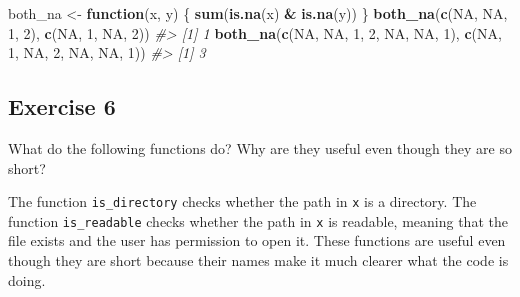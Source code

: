 \documentclass[]{book}
\newenvironment{Shaded}{\begin{snugshade}}{\end{snugshade}}
\newcommand{\CommentTok}[1]{\textcolor[rgb]{0.56,0.35,0.01}{\textit{#1}}}
\newcommand{\ControlFlowTok}[1]{\textcolor[rgb]{0.13,0.29,0.53}{\textbf{#1}}}
\newcommand{\DecValTok}[1]{\textcolor[rgb]{0.00,0.00,0.81}{#1}}
\newcommand{\KeywordTok}[1]{\textcolor[rgb]{0.13,0.29,0.53}{\textbf{#1}}}
\newcommand{\NormalTok}[1]{#1}
\newcommand{\OperatorTok}[1]{\textcolor[rgb]{0.81,0.36,0.00}{\textbf{#1}}}
\newcommand{\OtherTok}[1]{\textcolor[rgb]{0.56,0.35,0.01}{#1}}
\newcommand{\StringTok}[1]{\textcolor[rgb]{0.31,0.60,0.02}{#1}}
\theoremstyle{definition}
\theoremstyle{definition}
\theoremstyle{definition}
\theoremstyle{remark}
\begin{document}
\begin{Shaded}
\begin{Highlighting}[]
\NormalTok{both_na <-}\StringTok{ }\ControlFlowTok{function}\NormalTok{(x, y) \{}
  \KeywordTok{sum}\NormalTok{(}\KeywordTok{is.na}\NormalTok{(x) }\OperatorTok{&}\StringTok{ }\KeywordTok{is.na}\NormalTok{(y))}
\NormalTok{\}}
\KeywordTok{both_na}\NormalTok{(}\KeywordTok{c}\NormalTok{(}\OtherTok{NA}\NormalTok{, }\OtherTok{NA}\NormalTok{,  }\DecValTok{1}\NormalTok{, }\DecValTok{2}\NormalTok{),}
        \KeywordTok{c}\NormalTok{(}\OtherTok{NA}\NormalTok{,  }\DecValTok{1}\NormalTok{, }\OtherTok{NA}\NormalTok{, }\DecValTok{2}\NormalTok{))}
\CommentTok{#> [1] 1}
\KeywordTok{both_na}\NormalTok{(}\KeywordTok{c}\NormalTok{(}\OtherTok{NA}\NormalTok{, }\OtherTok{NA}\NormalTok{,  }\DecValTok{1}\NormalTok{, }\DecValTok{2}\NormalTok{, }\OtherTok{NA}\NormalTok{, }\OtherTok{NA}\NormalTok{, }\DecValTok{1}\NormalTok{), }
        \KeywordTok{c}\NormalTok{(}\OtherTok{NA}\NormalTok{,  }\DecValTok{1}\NormalTok{, }\OtherTok{NA}\NormalTok{, }\DecValTok{2}\NormalTok{, }\OtherTok{NA}\NormalTok{, }\OtherTok{NA}\NormalTok{, }\DecValTok{1}\NormalTok{))}
\CommentTok{#> [1] 3}
\end{Highlighting}
\end{Shaded}

\hypertarget{exercise-6-9}{%
\subsection{Exercise 6}\label{exercise-6-9}}

What do the following functions do? Why are they useful even though they
are so short?

\begin{Shaded}
\end{Shaded}

The function \texttt{is\_directory} checks whether the path in
\texttt{x} is a directory. The function \texttt{is\_readable} checks
whether the path in \texttt{x} is readable, meaning that the file exists
and the user has permission to open it. These functions are useful even
though they are short because their names make it much clearer what the
code is doing.
\end{document}
